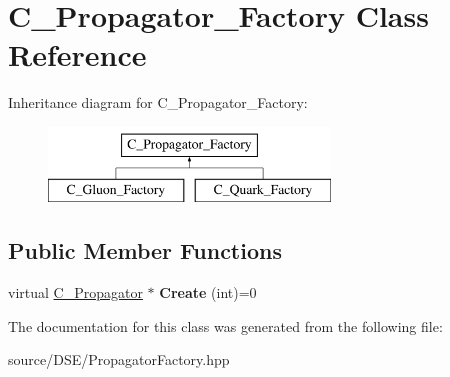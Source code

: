 \hypertarget{class_c___propagator___factory}{\section{C\-\_\-\-Propagator\-\_\-\-Factory Class Reference}
\label{class_c___propagator___factory}
}
Inheritance diagram for C\-\_\-\-Propagator\-\_\-\-Factory\-:\begin{figure}[H]
\begin{center}
\leavevmode
\includegraphics[height=2.000000cm]{class_c___propagator___factory}
\end{center}
\end{figure}
\subsection*{Public Member Functions}
\begin{DoxyCompactItemize}
\item 
\hypertarget{class_c___propagator___factory_aa795aee44b7c0e9b0cf737e9acc1b47b}{virtual \hyperlink{class_c___propagator}{C\-\_\-\-Propagator} $\ast$ {\bfseries Create} (int)=0}\label{class_c___propagator___factory_aa795aee44b7c0e9b0cf737e9acc1b47b}

\end{DoxyCompactItemize}


The documentation for this class was generated from the following file\-:\begin{DoxyCompactItemize}
\item 
source/\-D\-S\-E/Propagator\-Factory.\-hpp\end{DoxyCompactItemize}
